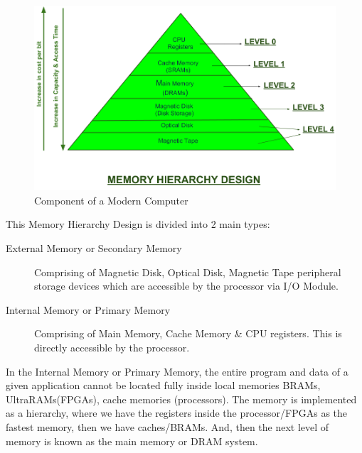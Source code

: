 \begin{figure}[H]
	\begin{center}
		\includegraphics[width=\textwidth]{images/MemoryStructure.png}
		\caption{Component of a Modern Computer}
		\label{MemoryStructure}
	\end{center}
\end{figure}

This Memory Hierarchy Design is divided into 2 main types:
\begin{description}
    \item[External Memory or Secondary Memory] Comprising of Magnetic Disk, Optical Disk, Magnetic Tape \ie peripheral storage devices which are accessible by the processor via I/O Module.
    \item[Internal Memory or Primary Memory] Comprising of Main Memory, Cache Memory \& CPU registers. This is directly accessible by the processor.
\end{description}

In the Internal Memory or Primary Memory, the entire program and data of a given application cannot be located fully inside local memories \eg BRAMs, UltraRAMs(FPGAs), cache memories (processors). The memory is implemented as a hierarchy, where we have the registers inside the processor/FPGAs as the fastest memory, then we have caches/BRAMs. And, then the next level of memory is known as the main memory or DRAM system. 